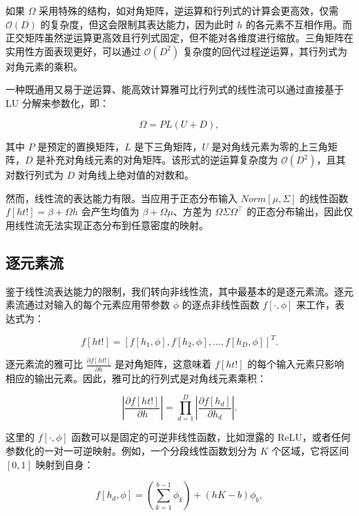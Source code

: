 \documentclass[lang=cn,newtx,10pt,scheme=chinese]{elegantbook}
\begin{document}
如果 \(\Omega\) 采用特殊的结构，如对角矩阵，逆运算和行列式的计算会更高效，仅需 \(\mathcal{O}(D)\) 的复杂度，但这会限制其表达能力，因为此时 \(h\) 的各元素不互相作用。而正交矩阵虽然逆运算更高效且行列式固定，但不能对各维度进行缩放。三角矩阵在实用性方面表现更好，可以通过 \(\mathcal{O}(D^2)\) 复杂度的回代过程逆运算，其行列式为对角元素的乘积。

一种既通用又易于逆运算、能高效计算雅可比行列式的线性流可以通过直接基于 LU 分解来参数化，即：

\begin{equation}
\Omega = PL(U + D), 
\end{equation}

其中 \(P\) 是预定的置换矩阵，\(L\) 是下三角矩阵，\(U\) 是对角线元素为零的上三角矩阵，\(D\) 是补充对角线元素的对角矩阵。该形式的逆运算复杂度为 \(\mathcal{O}(D^2)\)，且其对数行列式为 \(D\) 对角线上绝对值的对数和。

然而，线性流的表达能力有限。当应用于正态分布输入 \(Norm[\mu, \Sigma]\) 的线性函数 \(f[ht!] = \beta + \Omega h\) 会产生均值为 \(\beta + \Omega \mu\)、方差为 \(\Omega \Sigma \Omega^\top\) 的正态分布输出，因此仅用线性流无法实现正态分布到任意密度的映射。

\subsection{逐元素流}
鉴于线性流表达能力的限制，我们转向非线性流，其中最基本的是逐元素流。逐元素流通过对输入的每个元素应用带参数 \(\phi\) 的逐点非线性函数 \(f[\cdot, \phi]\) 来工作，表达式为：

\begin{equation}
f[ht!] = [f[h_1, \phi], f[h_2, \phi], ..., f[h_D, \phi]]^T. 
\end{equation}

逐元素流的雅可比 \(\frac{\partial f[ht!]}{\partial h}\) 是对角矩阵，这意味着 \(f[ht!]\) 的每个输入元素只影响相应的输出元素。因此，雅可比的行列式是对角线元素乘积：

\begin{equation}
\left| \frac{\partial f[ht!]}{\partial h} \right| = \prod_{d=1}^D \left| \frac{\partial f[h_d]}{\partial h_d} \right|. 
\end{equation}

这里的 \(f[\cdot, \phi]\) 函数可以是固定的可逆非线性函数，比如泄露的 ReLU，或者任何参数化的一对一可逆映射。例如，一个分段线性函数划分为 \(K\) 个区域，它将区间 \([0, 1]\) 映射到自身：

\begin{equation}
f[h_d, \phi] = \left( \sum_{k=1}^{b-1} \phi_k \right) + (hK - b)\phi_b, 
\end{equation}
\end{document}
